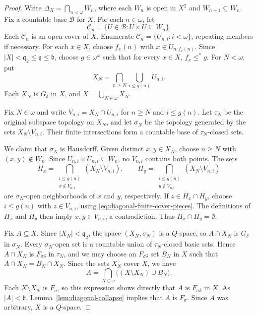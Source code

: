 \begin{proof}
Write
$\Delta_X=\bigcap_{n<\omega}W_n$, where each $W_n$ is open in $X^2$
and $W_{n+1}\subseteq W_n$.
Fix a countable base $\mathcal B$ for $X$. For each $n\in \omega$, let
\[
  \mathcal C_n=\{U\in \mathcal B:U\times U\subseteq W_n\}.
\]
Each $\mathcal C_n$ is an open cover of $X$.
Enumerate $\mathcal C_n=\{U_{n,i}:i<\omega\}$, repeating members
if necessary.
For each $x\in X$, choose $f_x(n)$ with $x\in U_{n,f_x(n)}$.
Since $|X|<\mathfrak q_2\leq\mathfrak q\leq\mathfrak b$,
choose $g\in\omega^\omega$ such that for every $x \in X$, $f_x\leq^*g$. For $N<\omega$, put
\begin{equation}\label{eq:diagonal-finite-cover-pieces}
  X_N=\bigcap_{n\geq N}\bigcup_{i\leq g(n)}U_{n,i}.
\end{equation}
Each $X_N$ is $G_\delta$ in $X$, and $X=\bigcup_{N\in \omega} X_N$.

Fix $N\in\omega$ and write
$V_{n,i}=X_N\cap U_{n,i}$ for $n\geq N$ and $i\leq g(n)$.
Let $\tau_N$ be the original subspace topology on $X_N$, and let
$\sigma_N$ be the topology generated by the sets $X_N\setminus V_{n,i}$.
Their finite intersections form a countable base of $\tau_N$-closed sets.

We claim that $\sigma_N$ is Hausdorff. Given distinct $x,y\in X_N$,
choose $n\geq N$ with $(x,y)\notin W_n$.
Since $U_{n,i}\times U_{n,i}\subseteq W_n$, no $V_{n,i}$ contains both points.
The sets
\[
  H_x=\bigcap_{\substack{i\leq g(n)\\x\notin V_{n,i}}}
       (X_N\setminus V_{n,i}),
  \qquad
  H_y=\bigcap_{\substack{i\leq g(n)\\y\notin V_{n,i}}}
       (X_N\setminus V_{n,i})
\]
are $\sigma_N$-open neighborhoods of $x$ and $y$, respectively.
If $z\in H_x\cap H_y$, choose $i\leq g(n)$ with $z\in V_{n,i}$,
using \eqref{eq:diagonal-finite-cover-pieces}.
The definitions of $H_x$ and $H_y$ then imply $x,y\in V_{n,i}$,
a contradiction. Thus $H_x\cap H_y=\emptyset$.

Fix $A\subseteq X$. Since $|X_N|<\mathfrak q_2$, the space
$(X_N,\sigma_N)$ is a $Q$-space, so $A\cap X_N$ is $G_\delta$
in $\sigma_N$. Every $\sigma_N$-open set is a countable union of
$\tau_N$-closed basic sets. Hence $A\cap X_N$ is $F_{\sigma\delta}$
in $\tau_N$, and we may choose an $F_{\sigma\delta}$ set $B_N$ in $X$
such that $A\cap X_N=B_N\cap X_N$. Since the sets $X_N$ cover $X$, we have
\[
  A=\bigcap_{N\in\omega}\bigl((X\setminus X_N)\cup B_N\bigr).
\]
Each $X\setminus X_N$ is $F_\sigma$, so this expression shows directly
that $A$ is $F_{\sigma\delta}$ in $X$. As $|A|<\mathfrak b$,
Lemma~\ref{lem:diagonal-collapse} implies that $A$ is $F_\sigma$.
Since $A$ was arbitrary, $X$ is a $Q$-space.
\end{proof}


